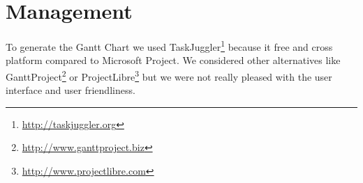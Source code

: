 \section{Management}

To generate the Gantt Chart we used
TaskJuggler\footnote{\url{http://taskjuggler.org}} because it free and cross
platform compared to Microsoft Project. We considered other alternatives like
GanttProject\footnote{\url{http://www.ganttproject.biz}} or
ProjectLibre\footnote{\url{http://www.projectlibre.com}} but we were not really
pleased with the user interface and user friendliness.
